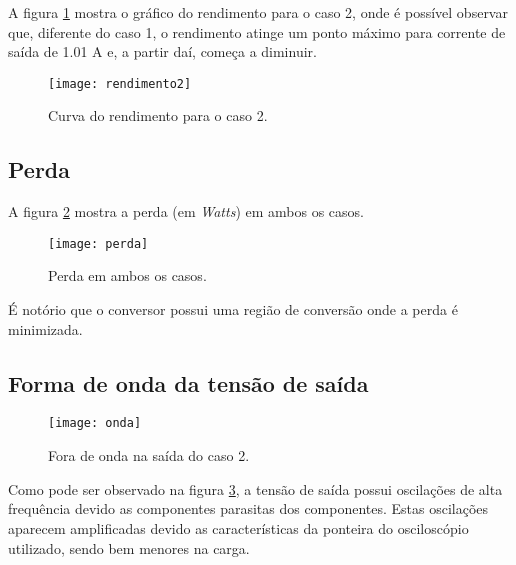 	A figura \ref{f_rend2} mostra o gráfico do rendimento para o caso 2, onde é possível observar que, diferente do caso 1, o rendimento atinge um ponto máximo para corrente de saída de 1.01 A e, a partir daí, começa a diminuir.
	
	\begin{figure}[H]
		\centering
		\caption{Curva do rendimento para o caso 2.}
		\texttt{[image: rendimento2]}
		\label{f_rend2}
	\end{figure}
	
\subsection{Perda}

	A figura \ref{f_perda} mostra a perda (em \textit{Watts}) em ambos os casos.

	\begin{figure}[H]
		\centering
		\caption{Perda em ambos os casos.}
		\texttt{[image: perda]}
		\label{f_perda}
	\end{figure}
	
	É notório que o conversor possui uma região de conversão onde a perda é minimizada.
	
\subsection{Forma de onda da tensão de saída}

	\begin{figure}[H]
		\centering
		\caption{Fora de onda na saída do caso 2.}
		\texttt{[image: onda]}
		\label{f_onda}
	\end{figure}
	
	Como pode ser observado na figura \ref{f_onda}, a tensão de saída possui oscilações de alta frequência devido as componentes parasitas dos componentes. Estas oscilações aparecem amplificadas devido as características da ponteira do osciloscópio utilizado, sendo bem menores na carga. 